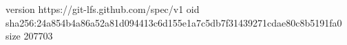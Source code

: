version https://git-lfs.github.com/spec/v1
oid sha256:24a854b4a86a52a81d094413c6d155e1a7c5db7f31439271cdae80c8b5191fa0
size 207703
